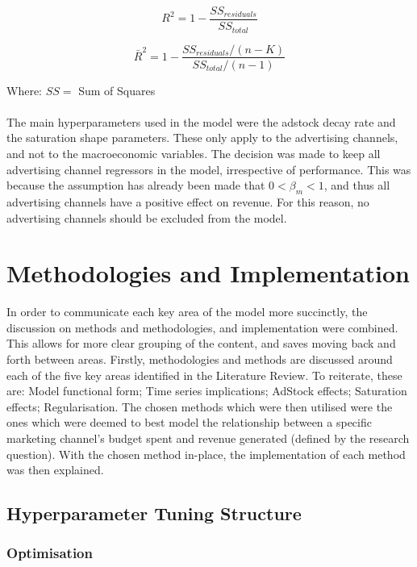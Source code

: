 \documentclass[11pt, a4paper]{article}
\begin{document}
\begin{equation}
R^2 = 1 - \frac{SS_{residuals}}{SS_{total}}
\end{equation}

\begin{equation}
\bar{R}^2 = 1 - \frac{SS_{residuals}/(n-K)}{SS_{total}/(n-1)}
\end{equation}

Where:
$SS=$ Sum of Squares\\\\
The main hyperparameters used in the model were the adstock decay rate and the saturation shape parameters. These only apply to the advertising channels, and not to the macroeconomic variables. The decision was made to keep all advertising channel regressors in the model, irrespective of performance. This was because the assumption has already been made that $0<\beta_m<1$, and thus all advertising channels have a positive effect on revenue. For this reason, no advertising channels should be excluded from the model. 

\section{Methodologies and Implementation}

In order to communicate each key area of the model more succinctly, the discussion on methods and methodologies, and implementation were combined. This allows for more clear grouping of the content, and saves moving back and forth between areas. Firstly, methodologies and methods are discussed around each of the five key areas identified in the Literature Review. To reiterate, these are: Model functional form; Time series implications; AdStock effects; Saturation effects; Regularisation. The chosen methods which were then utilised were the ones which were deemed to best model the relationship between a specific marketing channel’s budget spent and revenue generated (defined by the research question). With the chosen method in-place, the implementation of each method was then explained.

\subsection{Hyperparameter Tuning Structure}

\subsubsection{Optimisation}
\end{document}
